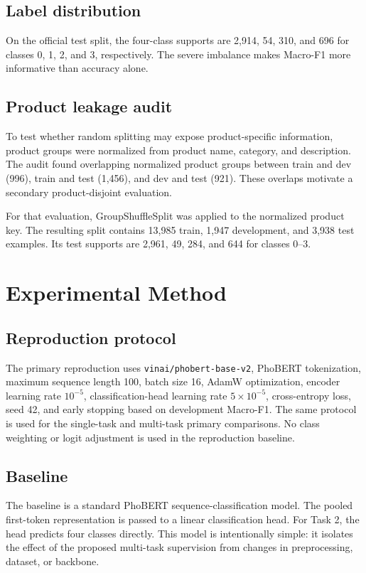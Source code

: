 \documentclass[runningheads]{llncs}
\begin{document}
\subsection{Label distribution}
On the official test split, the four-class supports are 2,914, 54, 310, and 696 for classes 0, 1, 2, and 3, respectively. The severe imbalance makes Macro-F1 more informative than accuracy alone.

\subsection{Product leakage audit}
To test whether random splitting may expose product-specific information, product groups were normalized from product name, category, and description. The audit found overlapping normalized product groups between train and dev (996), train and test (1,456), and dev and test (921). These overlaps motivate a secondary product-disjoint evaluation.

For that evaluation, GroupShuffleSplit was applied to the normalized product key. The resulting split contains 13,985 train, 1,947 development, and 3,938 test examples. Its test supports are 2,961, 49, 284, and 644 for classes 0--3.

\section{Experimental Method}
\subsection{Reproduction protocol}
The primary reproduction uses \texttt{vinai/phobert-base-v2}, PhoBERT tokenization, maximum sequence length 100, batch size 16, AdamW optimization, encoder learning rate $10^{-5}$, classification-head learning rate $5\times10^{-5}$, cross-entropy loss, seed 42, and early stopping based on development Macro-F1. The same protocol is used for the single-task and multi-task primary comparisons. No class weighting or logit adjustment is used in the reproduction baseline.

\subsection{Baseline}
The baseline is a standard PhoBERT sequence-classification model. The pooled first-token representation is passed to a linear classification head. For Task 2, the head predicts four classes directly. This model is intentionally simple: it isolates the effect of the proposed multi-task supervision from changes in preprocessing, dataset, or backbone.
\end{document}
